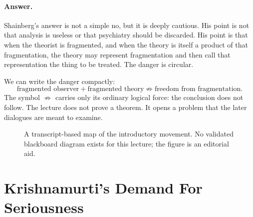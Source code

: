 \paragraph{Answer.}
Shainberg's answer is not a simple no, but it is deeply cautious. His point is not that analysis is useless or that psychiatry should be discarded. His point is that when the theorist is fragmented, and when the theory is itself a product of that fragmentation, the theory may represent fragmentation and then call that representation the thing to be treated. The danger is circular.

We can write the danger compactly:
\begin{equation}
\text{fragmented observer}
+
\text{fragmented theory}
\not\Rightarrow
\text{freedom from fragmentation}.
\end{equation}
The symbol \(\not\Rightarrow\) carries only its ordinary logical force: the conclusion does not follow. The lecture does not prove a theorem. It opens a problem that the later dialogues are meant to examine.

\begin{figure}
\centering
{}
\caption{A transcript-based map of the introductory movement. No validated blackboard diagram exists for this lecture; the figure is an editorial aid.}
\end{figure}

\section{Krishnamurti's Demand For Seriousness}

